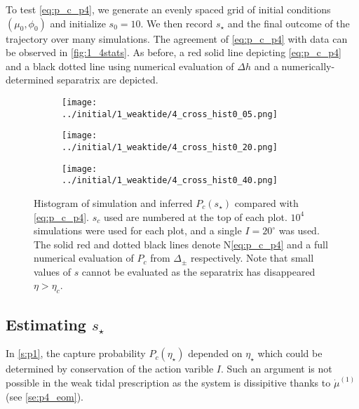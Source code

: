 \documentclass[
        fleqn,
        usenatbib,
    ]{mnras}
\begin{document}
To test \autoref{eq:p_c_p4}, we generate an evenly spaced grid of initial
conditions $(\mu_0, \phi_0)$ and initialize $s_0 = 10$. We then record $s_\star$
and the final outcome of the trajectory over many simulations. The agreement of
\autoref{eq:p_c_p4} with data can be observed in \autoref{fig:1_4stats}. As
before, a red solid line depicting \autoref{eq:p_c_p4} and a black dotted line
using numerical evaluation of $\Delta h$ and a numerically-determined separatrix
are depicted.
\begin{figure}
    \centering
    \begin{subfigure}{\columnwidth}
        \centering
        \texttt{[image: ../initial/1\_weaktide/4\_cross\_hist0\_05.png]}
    \end{subfigure}

    \begin{subfigure}{\columnwidth}
        \centering
        \texttt{[image: ../initial/1\_weaktide/4\_cross\_hist0\_20.png]}
    \end{subfigure}

    \begin{subfigure}{\columnwidth}
        \centering
        \texttt{[image: ../initial/1\_weaktide/4\_cross\_hist0\_40.png]}
    \end{subfigure}

    \caption{Histogram of simulation and inferred $P_c(s_\star)$ compared with
    \autoref{eq:p_c_p4}. $s_c$ used are numbered at the top of each plot. $10^4$
    simulations were used for each plot, and a single $I = 20^\circ$ was
    used. The solid red and dotted black lines denote N\autoref{eq:p_c_p4} and a
    full numerical evaluation of $P_c$ from $\Delta_{\pm}$ respectively. Note
    that small values of $s$ cannot be evaluated as the separatrix has
    disappeared $\eta > \eta_c$.}\label{fig:1_4stats}
\end{figure}

\subsection{Estimating $s_\star$}

In \autoref{s:p1}, the capture probability $P_c(\eta_\star)$ depended on
$\eta_\star$ which could be determined by conservation of the action varible
$I$. Such an argument is not possible in the weak tidal prescription as the
system is dissipitive thanks to $\dot{\mu}^{(1)}$ (see \autoref{se:p4_eom}).
\end{document}
